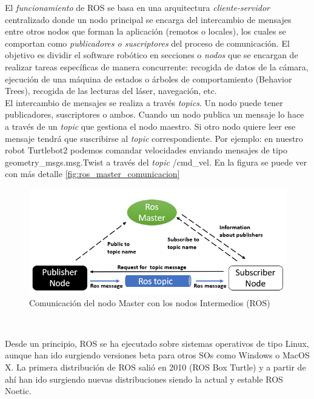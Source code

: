 El \textit{funcionamiento} de ROS se basa en una arquitectura \textit{cliente-servidor} centralizado donde un nodo principal se encarga del intercambio de mensajes entre otros nodos que forman la aplicación (remotos o locales), los cuales se comportan como \textit{publicadores o suscriptores} del proceso de comunicación. El objetivo es dividir el software robótico en secciones o \textit{nodos} que se encargan de realizar tareas específicas de manera concurrente: recogida de datos de la cámara, ejecución de una máquina de estados o árboles de comportamiento (Behavior Trees), recogida de las lecturas del láser, navegación, etc.\\

El intercambio de mensajes se realiza a través \textit{topics}. Un nodo puede tener publicadores, suscriptores o ambos. Cuando un nodo publica un mensaje lo hace a través de un \textit{topic} que gestiona el nodo maestro. Si otro nodo quiere leer ese mensaje tendrá que suscribirse al \textit{topic} correspondiente. Por ejemplo: en nuestro robot Turtlebot2 podemos comandar velocidades enviando mensajes de tipo geometry\_msgs.msg.Twist a través del \textit{topic} /cmd\_vel. En la figura se puede ver con más detalle \ref{fig:ros_master_comunicacion}\\

\begin{figure} [H]
  \begin{center}
    \includegraphics[width=15cm]{imagenes/cap3/ros_master_communication.png}
  \end{center}
  \caption{Comunicación del nodo Master con los nodos Intermedios (ROS)}
  \label{fig:ros_master_comunicación}
\end{figure}\

Desde un principio, ROS se ha ejecutado sobre sistemas operativos de tipo Linux, aunque han ido surgiendo versiones beta para otros SOs como Windows o MacOS X. La primera distribución de ROS salió en 2010 (ROS Box Turtle) y a partir de ahí han ido surgiendo nuevas distribuciones siendo la actual y estable ROS Noetic.\\

